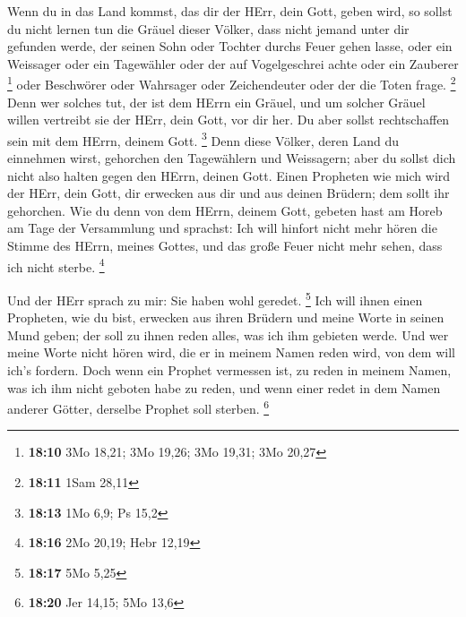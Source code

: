  Wenn du in das Land kommst, das dir der HErr, dein Gott,
geben wird, so sollst du nicht lernen tun die Gräuel dieser Völker,
 dass nicht jemand unter dir gefunden werde, der seinen
Sohn oder Tochter durchs Feuer gehen lasse, oder ein Weissager oder ein
Tagewähler oder der auf Vogelgeschrei achte oder ein Zauberer
\footnote{\textbf{18:10} 3Mo 18,21; 3Mo 19,26; 3Mo 19,31; 3Mo 20,27}
 oder Beschwörer oder Wahrsager oder Zeichendeuter oder der
die Toten frage. \footnote{\textbf{18:11} 1Sam 28,11}  Denn
wer solches tut, der ist dem HErrn ein Gräuel, und um solcher Gräuel
willen vertreibt sie der HErr, dein Gott, vor dir her.  Du
aber sollst rechtschaffen sein mit dem HErrn, deinem Gott. \footnote{\textbf{18:13}
  1Mo 6,9; Ps 15,2}  Denn diese Völker, deren Land du
einnehmen wirst, gehorchen den Tagewählern und Weissagern; aber du
sollst dich nicht also halten gegen den HErrn, deinen Gott.
 Einen Propheten wie mich wird der HErr, dein Gott, dir
erwecken aus dir und aus deinen Brüdern; dem sollt ihr gehorchen.
 Wie du denn von dem HErrn, deinem Gott, gebeten hast am
Horeb am Tage der Versammlung und sprachst: Ich will hinfort nicht mehr
hören die Stimme des HErrn, meines Gottes, und das große Feuer nicht
mehr sehen, dass ich nicht sterbe. \footnote{\textbf{18:16} 2Mo 20,19;
  Hebr 12,19}

 Und der HErr sprach zu mir: Sie haben wohl geredet.
\footnote{\textbf{18:17} 5Mo 5,25}  Ich will ihnen einen
Propheten, wie du bist, erwecken aus ihren Brüdern und meine Worte in
seinen Mund geben; der soll zu ihnen reden alles, was ich ihm gebieten
werde.  Und wer meine Worte nicht hören wird, die er in
meinem Namen reden wird, von dem will ich's fordern.  Doch
wenn ein Prophet vermessen ist, zu reden in meinem Namen, was ich ihm
nicht geboten habe zu reden, und wenn einer redet in dem Namen anderer
Götter, derselbe Prophet soll sterben. \footnote{\textbf{18:20} Jer
  14,15; 5Mo 13,6}

